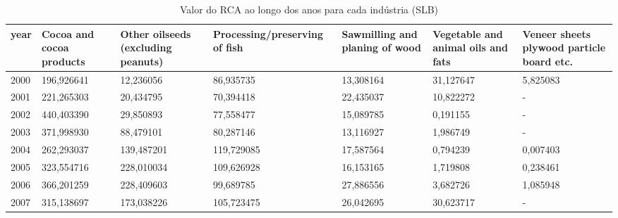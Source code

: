 \begin{table}
\centering
\caption{Valor do RCA ao longo dos anos para cada indústria (SLB)}
\begin{tabular}{p{1cm}p{2cm}p{2cm}p{2cm}p{2cm}p{2cm}p{2cm}}
\toprule
 year &  Cocoa and cocoa products &  Other oilseeds (excluding peanuts) &  Processing/preserving of fish &  Sawmilling and planing of wood &  Vegetable and animal oils and fats &  Veneer sheets plywood particle board etc. \\
\midrule
 2000 &                196,926641 &                           12,236056 &                      86,935735 &                       13,308164 &                           31,127647 &                                   5,825083 \\
 2001 &                221,265303 &                           20,434795 &                      70,394418 &                       22,435037 &                           10,822272 &                                          - \\
 2002 &                440,403390 &                           29,850893 &                      77,558477 &                       15,089785 &                            0,191155 &                                          - \\
 2003 &                371,998930 &                           88,479101 &                      80,287146 &                       13,116927 &                            1,986749 &                                          - \\
 2004 &                262,293037 &                          139,487201 &                     119,729085 &                       17,587564 &                            0,794239 &                                   0,007403 \\
 2005 &                323,554716 &                          228,010034 &                     109,626928 &                       16,153165 &                            1,719808 &                                   0,238461 \\
 2006 &                366,201259 &                          228,409603 &                      99,689785 &                       27,886556 &                            3,682726 &                                   1,085948 \\
 2007 &                315,138697 &                          173,038226 &                     105,723475 &                       26,042695 &                           30,623717 &                                          - \\

\end{tabular}
\end{table}
